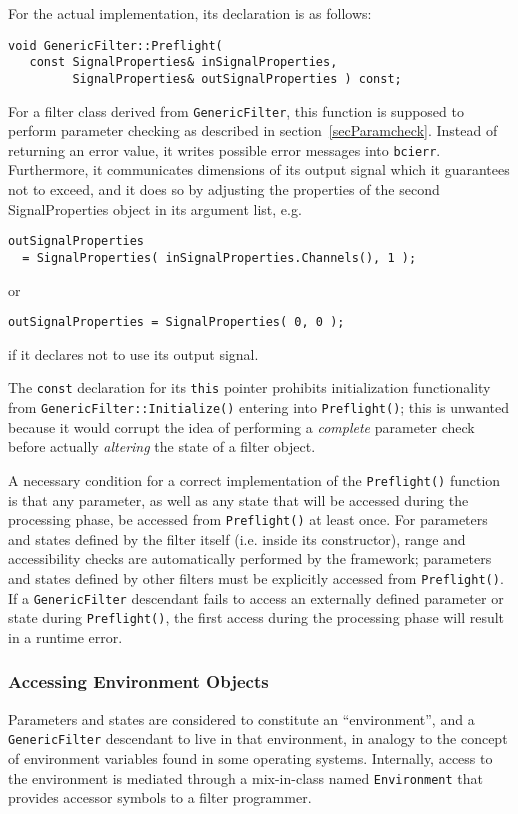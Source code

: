 \documentclass[12pt,letterpaper]{article}
\begin{document}
For the actual implementation, its declaration is as follows:
\begin{verbatim}
void GenericFilter::Preflight(
   const SignalProperties& inSignalProperties,
         SignalProperties& outSignalProperties ) const;
\end{verbatim}

For a filter class derived from
\texttt{GenericFilter}, this function is supposed to perform
parameter checking as described in section~\ref{secParamcheck}.
Instead of returning an error value, it writes possible error
messages into \texttt{bcierr}.
Furthermore, it communicates dimensions of its output signal
which it guarantees not to exceed, and it does so by adjusting
the properties of the second SignalProperties object in its
argument list, e.g.
\begin{verbatim}
outSignalProperties
  = SignalProperties( inSignalProperties.Channels(), 1 );
\end{verbatim}
or
\begin{verbatim}
outSignalProperties = SignalProperties( 0, 0 );
\end{verbatim}
if it declares not to use its output signal.

The \texttt{const} declaration for its \texttt{this} pointer
prohibits initialization functionality from
\texttt{GenericFilter::Initialize()} entering into
\texttt{Preflight()}; this is unwanted because it would
corrupt the idea of performing a \textit{complete} parameter check
before actually \textit{altering} the state of a filter object.

A necessary condition for a correct implementation of the
\texttt{Preflight()} function is that any parameter, as well as any
state that will be accessed during the processing phase, be accessed
from \texttt{Preflight()} at least once. For parameters and states
defined by the filter itself (i.e. inside its constructor), range
and accessibility checks are automatically performed by the framework;
parameters and states defined by other filters must be explicitly accessed
from \texttt{Preflight()}. If a \texttt{GenericFilter} descendant fails to
access an externally defined parameter or state during \texttt{Preflight()},
the first access during the processing phase will result in a runtime error.

\subsubsection{Accessing Environment Objects}
Parameters and states are considered to constitute an ``environment'', and a
\texttt{GenericFilter} descendant to live in that environment, in analogy to
the concept of environment variables found in some operating systems.
Internally, access to the environment is mediated through a mix-in-class named
\texttt{Environment} that provides accessor symbols to a filter programmer.
\end{document}
